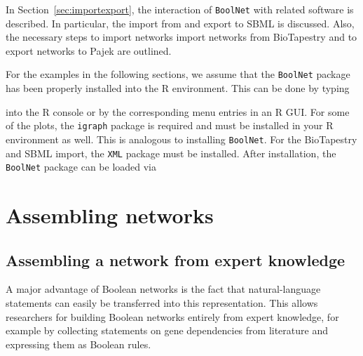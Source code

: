 \documentclass[a4paper]{article}
\begin{document}
In Section~\ref{sec:importexport}, the interaction of \texttt{BoolNet} with related software is described. In particular, the import from and export to SBML is discussed. Also, the necessary steps to import networks import networks from BioTapestry and to export networks to Pajek are outlined. 

For the examples in the following sections, we assume that the \texttt{BoolNet} package has been properly installed into the R environment. This can be done by typing
\begin{knitrout}
\color{fgcolor}\begin{kframe}
\begin{alltt}
\hlstd{(}\hlstd{)}
\end{alltt}
\end{kframe}
\end{knitrout}
into the R console or by the corresponding menu entries in an R GUI. For some of the plots, the \texttt{igraph} package is required and must be installed in your R environment as well. This is analogous to installing \texttt{BoolNet}. For the BioTapestry and SBML import, the \texttt{XML} package must be installed.
After installation, the \texttt{BoolNet} package can be loaded via
\begin{knitrout}
\color{fgcolor}\begin{kframe}
\begin{alltt}
\end{alltt}
\end{kframe}
\end{knitrout}


\section{Assembling networks}\label{sec:assemblingnetworks}

\subsection{Assembling a network from expert knowledge}

A major advantage of Boolean networks is the fact that natural-language statements can easily be transferred into this representation. This allows researchers for building Boolean networks entirely from expert knowledge, for example by collecting statements on gene dependencies from literature and expressing them as Boolean rules. 
\end{document}
